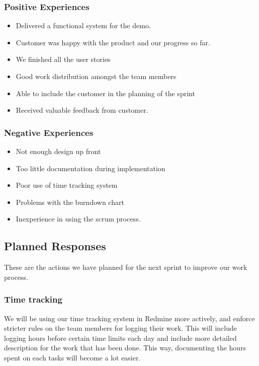 \subsubsection{Positive Experiences}

\begin{itemize}
\item Delivered a functional system for the demo.
\item Customer was happy with the product and our progress so far.
\item We finished all the user stories
\item Good work distribution amongst the team members
\item Able to include the customer in the planning of the sprint
\item Received valuable feedback from customer.
\end{itemize}

\subsubsection{Negative Experiences}
\begin{itemize}
\item Not enough design up front
\item Too little documentation during implementation 
\item Poor use of time tracking system
\item Problems with the burndown chart
\item Inexperience in using the scrum process.
\end{itemize}

\subsection{Planned Responses}
These are the actions we have planned for the next sprint to improve our work process.

\subsubsection{Time tracking}
We will be using our time tracking system in Redmine more actively, and enforce stricter rules on the team members for logging their work. This will include logging hours before certain time limits each day and include more detailed description for the work that has been done. This way, documenting the hours spent on each tasks will become a lot easier.

